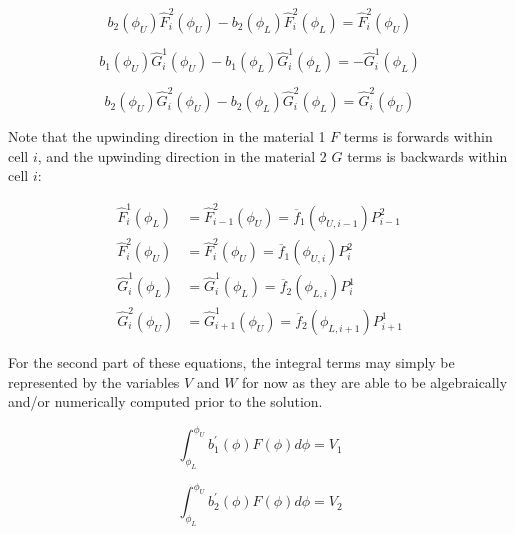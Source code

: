\documentclass[12pt,a4paper,pagesize=pdftex]{scrartcl}
\begin{document}
\begin{equation*}
    b_2\left(\phi_U\right) \hat{F}^2_i\left(\phi_U\right) - b_2\left(\phi_L\right) \hat{F}^2_{i}\left(\phi_L\right) = \hat{F}^2_i\left(\phi_U\right)
\end{equation*}

\begin{equation*}
    b_1\left(\phi_U\right) \hat{G}^1_{i}\left(\phi_U\right) - b_1\left(\phi_L\right) \hat{G}^1_i\left(\phi_L\right) = - \hat{G}^1_i\left(\phi_L\right)
\end{equation*}

\begin{equation*}
    b_2\left(\phi_U\right) \hat{G}^2_{i}\left(\phi_U\right) - b_2\left(\phi_L\right) \hat{G}^2_i\left(\phi_L\right) = \hat{G}^2_{i} \left(\phi_U\right)
\end{equation*}

Note that the upwinding direction in the material 1 \(F\) terms is forwards within cell \(i\), and the upwinding direction in the material 2 \(G\) terms is backwards within cell \(i\):

\begin{align*}
    \hat{F}^1_i\left(\phi_L\right) &= \hat{F}^2_{i-1}\left(\phi_U\right) = \overline{f}_1\left(\phi_{U,i-1}\right) P^{2}_{i-1} \\
    \hat{F}^2_i\left(\phi_U\right) &= \hat{F}^2_{i}\left(\phi_U\right) = \overline{f}_1\left(\phi_{U,i}\right) P^{2}_{i} \\
    \hat{G}^1_i\left(\phi_L\right) &= \hat{G}^1_i\left(\phi_L\right) = \overline{f}_2\left(\phi_{L,i}\right) P^1_i \\
    \hat{G}^2_i\left(\phi_U\right) &= \hat{G}^1_{i+1}\left(\phi_U\right) = \overline{f}_2\left(\phi_{L,i+1}\right) P^1_{i+1}
\end{align*}

For the second part of these equations, the integral terms may simply be represented by the variables \(V\) and \(W\) for now as they are able to be algebraically and/or numerically computed prior to the solution.

\begin{equation*}
    \int_{\phi_L}^{\phi_U} b_1^\prime\left(\phi\right) F\left(\phi\right) d\phi = V_1
\end{equation*}

\begin{equation*}
    \int_{\phi_L}^{\phi_U} b_2^\prime\left(\phi\right) F\left(\phi\right) d\phi = V_2
\end{equation*}
\end{document}
